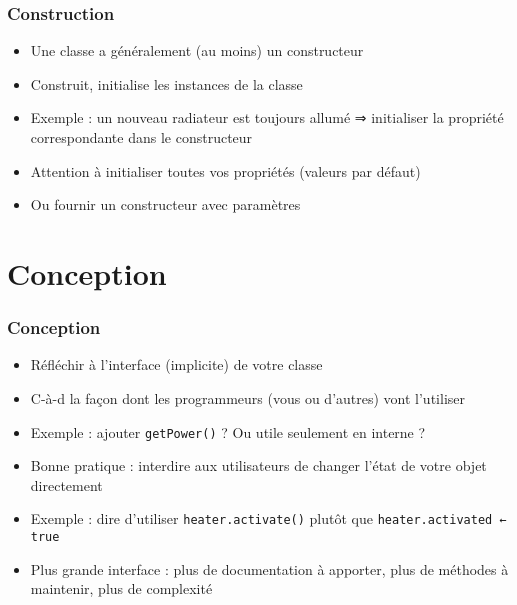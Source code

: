 \documentclass[english, french]{beamer}
\begin{document}
\begin{frame}
	\frametitle{Construction}
	\begin{itemize}
		\item Une classe a {\tiny généralement} (au moins) un constructeur
		\item Construit, initialise les instances de la classe
		\item Exemple : un nouveau radiateur est toujours allumé ⇒ initialiser la propriété correspondante dans le constructeur
		\item Attention à initialiser toutes vos propriétés (valeurs par défaut)
		\item Ou fournir un constructeur avec paramètres
	\end{itemize}
\end{frame}

\section{Conception}
\begin{frame}
	\frametitle{Conception}
	\begin{itemize}
		\item Réfléchir à l’interface (implicite) de votre classe
		\item C-à-d la façon dont les programmeurs (vous ou d’autres) vont l’utiliser
		\item Exemple : ajouter \texttt{getPower()} ? Ou utile seulement en interne ?
		\item Bonne pratique : interdire aux utilisateurs de changer l’état de votre objet directement
		\item Exemple : dire d’utiliser \texttt{heater.activate()} plutôt que \texttt{heater.activated ← true}
		\item Plus grande interface : plus de documentation à apporter, plus de méthodes à maintenir, plus de complexité
	\end{itemize}
\end{frame}
\end{document}
